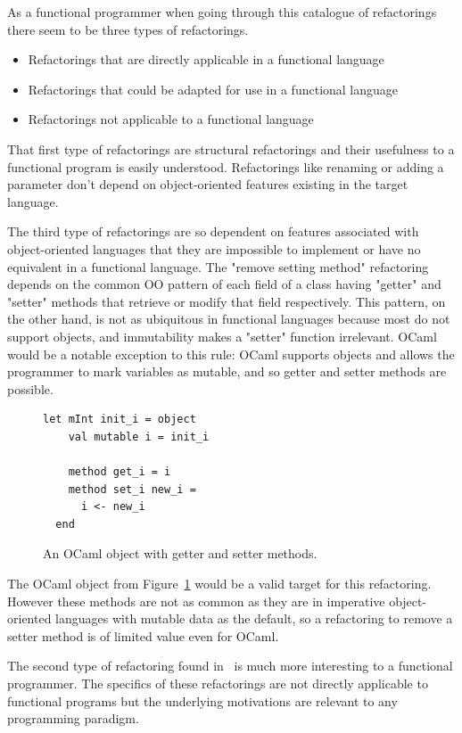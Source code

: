 As a functional programmer when going through this catalogue of refactorings there seem to be three types of refactorings.

\begin{itemize}
	\item Refactorings that are directly applicable in a functional language
	\item Refactorings that could be adapted for use in a functional language
	\item Refactorings not applicable to a functional language
\end{itemize}

That first type of refactorings are structural refactorings and their usefulness to a functional program is easily understood. Refactorings like renaming or adding a parameter don't depend on object-oriented features existing in the target language.

The third type of refactorings are so dependent on features associated with object-oriented languages that they are impossible to implement or have no equivalent in a functional language. The "remove setting method" refactoring depends on the common OO pattern of each field of a class having "getter" and "setter" methods that retrieve or modify that field respectively. This pattern, on the other hand, is not as ubiquitous in functional languages because most do not support objects, and immutability makes a "setter" function irrelevant. OCaml would be a notable exception to this rule: OCaml supports objects and allows the programmer to mark variables as mutable, and so getter and setter methods are possible.

\begin{figure}[t]
\begin{lstlisting}[language=caml, morekeywords={object,method}]
let mInt init_i = object
    val mutable i = init_i

    method get_i = i
    method set_i new_i =
      i <- new_i
  end
\end{lstlisting}
\caption{An OCaml object with getter and setter methods.}
\label{ocamlObj}
\end{figure}

The OCaml object from Figure~\ref{ocamlObj} would be a valid target for this refactoring. However these methods are not as common as they are in imperative object-oriented languages with mutable data as the default, so a refactoring to remove a setter method is of limited value even for OCaml.

The second type of refactoring found in~\citep{fowler} is much more interesting to a functional programmer. The specifics of these refactorings are not directly applicable to functional programs but the underlying motivations are relevant to any programming paradigm. 

